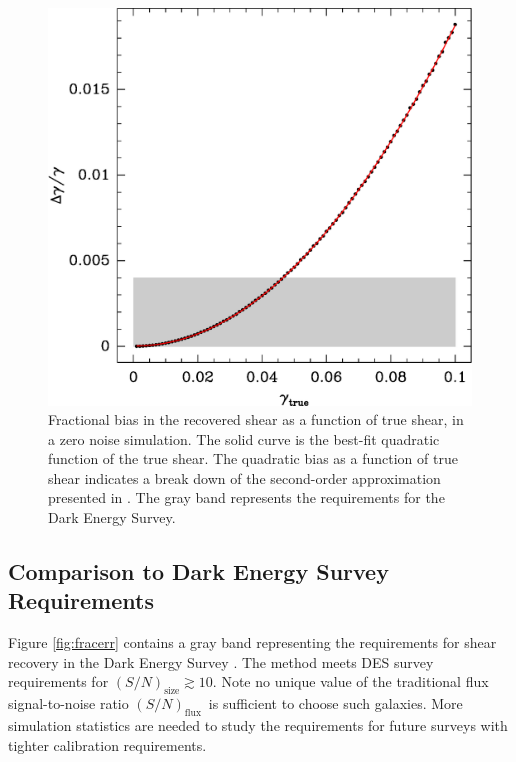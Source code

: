 \documentclass[12pt,preprint]{aastex}
\newcommand{\Tsn}{$(S/N)_{\textrm{size}}$}
\newcommand{\fsn}{$(S/N)_{\textrm{flux}}$}
\begin{document}
\begin{figure}[t] \centering
 \centering 
 \includegraphics[scale=0.6]{figures/fracerr-vs-shear.eps}

 \caption{Fractional bias in the recovered shear as a function of true shear,
     in a zero noise simulation.  The solid curve is the best-fit quadratic
     function of the true shear.  The quadratic bias as a function of true
     shear indicates a break down of the second-order approximation presented
     in \cite{ba13}. The gray band represents the requirements for the Dark
 Energy Survey. \label{fig:nonoise}}

\end{figure}

\subsection{Comparison to Dark Energy Survey Requirements} \label{sec:desreq}

Figure \ref{fig:fracerr} contains a gray band representing the requirements for
shear recovery in the Dark Energy Survey \citep[][DES]{DESWhitePaper}.  The
method meets DES survey requirements for \Tsn$ \gtrsim 10$.  Note no unique
value of the traditional flux signal-to-noise ratio \fsn\ is sufficient to
choose such galaxies.  More simulation statistics are needed to study the
requirements for future surveys with tighter calibration requirements.
\end{document}
